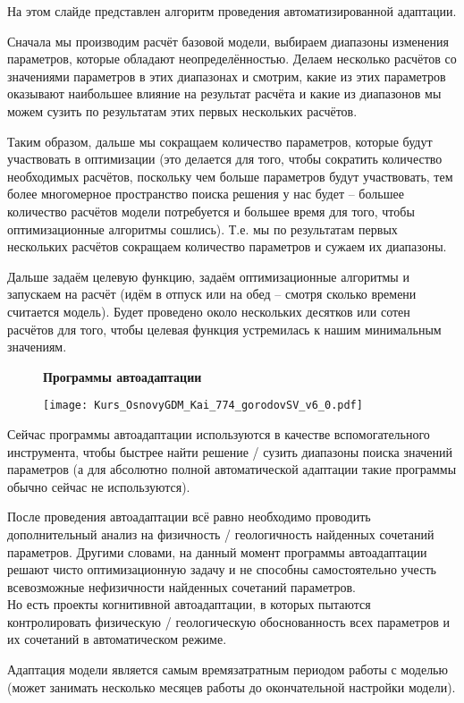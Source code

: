 На этом слайде представлен алгоритм проведения автоматизированной адаптации.

Сначала мы производим расчёт базовой модели, выбираем диапазоны изменения параметров, которые обладают неопределённостью.
Делаем несколько расчётов со значениями параметров в этих диапазонах и смотрим, какие из этих параметров оказывают наибольшее влияние на результат расчёта и какие из диапазонов мы можем сузить по результатам этих первых нескольких расчётов.

Таким образом, дальше мы сокращаем количество параметров, которые будут участвовать в оптимизации (это делается для того, чтобы сократить количество необходимых расчётов, поскольку чем больше параметров будут участвовать, тем более многомерное пространство поиска решения у нас будет -- большее количество расчётов модели потребуется и большее время для того, чтобы оптимизационные алгоритмы сошлись).
Т.е. мы по результатам первых нескольких расчётов сокращаем количество параметров и сужаем их диапазоны.

Дальше задаём целевую функцию, задаём оптимизационные алгоритмы и запускаем на расчёт (идём в отпуск или на обед -- смотря сколько времени считается модель).
Будет проведено около нескольких десятков или сотен расчётов для того, чтобы целевая функция устремилась к нашим минимальным значениям.
\\

\begin{figure}[H]
\textbf{Программы автоадаптации}

\texttt{[image: Kurs\_OsnovyGDM\_Kai\_774\_gorodovSV\_v6\_0.pdf]}
\end{figure}

Сейчас программы автоадаптации используются в качестве вспомогательного инструмента, чтобы быстрее найти решение / сузить диапазоны поиска значений параметров (а для абсолютно полной автоматической адаптации такие программы обычно сейчас не используются).

После проведения автоадаптации всё равно необходимо проводить дополнительный анализ на физичность / геологичность найденных сочетаний параметров.
Другими словами, на данный момент программы автоадаптации решают чисто оптимизационную задачу и не способны самостоятельно учесть всевозможные нефизичности найденных сочетаний параметров.
\\

Но есть проекты когнитивной автоадаптации, в которых пытаются контролировать физическую / геологическую обоснованность всех параметров и их сочетаний в автоматическом режиме.

Адаптация модели является самым времязатратным периодом работы с моделью (может занимать несколько месяцев работы до окончательной настройки модели).

